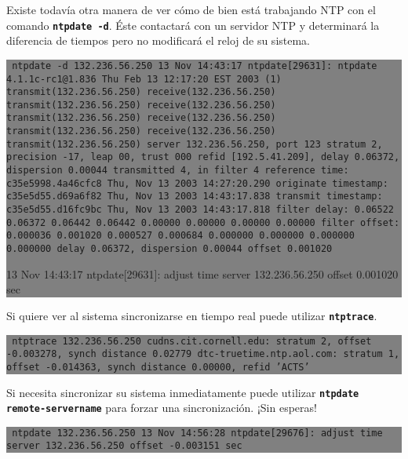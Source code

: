 \documentclass[12pt]{article}
\begin{document}
	
	
	

Existe todavía otra manera de ver cómo de bien está trabajando NTP con 
el comando \texttt{\textbf{ntpdate -d}}. Éste contactará con un servidor NTP y
determinará la diferencia de tiempos pero no modificará el reloj de su sistema.



\colorbox{grey}{\parbox[t]{0.95\linewidth}{ \vspace*{0.5cm} {\tt 
ntpdate -d 132.236.56.250
13 Nov 14:43:17 ntpdate[29631]: ntpdate 4.1.1c-rc1@1.836 Thu Feb 13 12:17:20 EST 2003 (1)
transmit(132.236.56.250)
receive(132.236.56.250)
transmit(132.236.56.250)
receive(132.236.56.250)
transmit(132.236.56.250)
receive(132.236.56.250)
transmit(132.236.56.250)
receive(132.236.56.250)
transmit(132.236.56.250)
server 132.236.56.250, port 123
stratum 2, precision -17, leap 00, trust 000
refid [192.5.41.209], delay 0.06372, dispersion 0.00044
transmitted 4, in filter 4
reference time:    c35e5998.4a46cfc8  Thu, Nov 13 2003 14:27:20.290
originate timestamp: c35e5d55.d69a6f82  Thu, Nov 13 2003 14:43:17.838
transmit timestamp:  c35e5d55.d16fc9bc  Thu, Nov 13 2003 14:43:17.818
filter delay:  0.06522  0.06372  0.06442  0.06442
         0.00000  0.00000  0.00000  0.00000
filter offset: 0.000036 0.001020 0.000527 0.000684
         0.000000 0.000000 0.000000 0.000000
delay 0.06372, dispersion 0.00044
offset 0.001020

13 Nov 14:43:17 ntpdate[29631]: adjust time server 132.236.56.250 offset 0.001020 sec
 } \vspace*{0.5cm} } } 

Si quiere ver al sistema sincronizarse en tiempo real puede utilizar 
\texttt{\textbf{ntptrace}}.


\colorbox{grey}{\parbox[t]{0.95\linewidth}{ \vspace*{0.5cm} {\tt 
ntptrace 132.236.56.250
cudns.cit.cornell.edu: stratum 2, offset -0.003278, synch distance 0.02779
dtc-truetime.ntp.aol.com: stratum 1, offset -0.014363, synch distance 0.00000, refid 'ACTS' 
} \vspace*{0.5cm} } } 

	

	
	
Si necesita sincronizar su sistema inmediatamente puede utilizar
\texttt{\textbf{ntpdate remote-servername}} para forzar una sincronización. ¡Sin esperas!


\colorbox{grey}{\parbox[t]{0.95\linewidth}{ \vspace*{0.5cm} {\tt
ntpdate 132.236.56.250
13 Nov 14:56:28 ntpdate[29676]: adjust time server 132.236.56.250 offset -0.003151 sec
  } \vspace*{0.5cm} } } 
\end{document}
